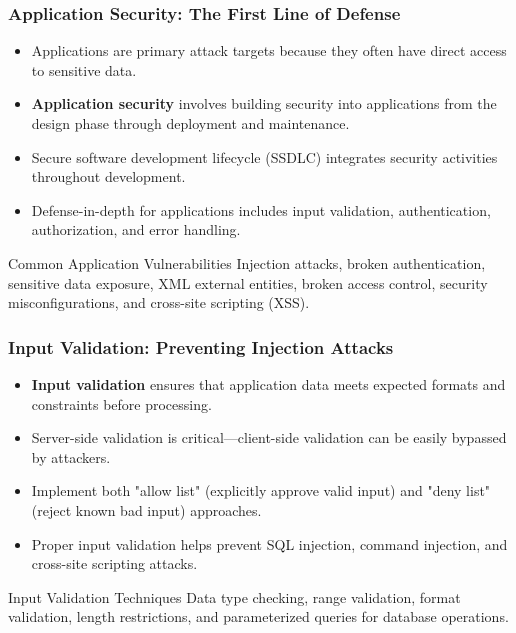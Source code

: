 \documentclass{beamer}
\begin{document}
\begin{frame}
    \frametitle{Application Security: The First Line of Defense}
    
    \begin{itemize}
        \item Applications are primary attack targets because they often have direct access to sensitive data.
        \item \textbf{Application security} involves building security into applications from the design phase through deployment and maintenance.
        \item Secure software development lifecycle (SSDLC) integrates security activities throughout development.
        \item Defense-in-depth for applications includes input validation, authentication, authorization, and error handling.
    \end{itemize}
    
    \begin{alertblock}{Common Application Vulnerabilities}
        Injection attacks, broken authentication, sensitive data exposure, XML external entities, broken access control, security misconfigurations, and cross-site scripting (XSS).
    \end{alertblock}
\end{frame}

\begin{frame}
    \frametitle{Input Validation: Preventing Injection Attacks}
    
    \begin{itemize}
        \item \textbf{Input validation} ensures that application data meets expected formats and constraints before processing.
        \item Server-side validation is critical—client-side validation can be easily bypassed by attackers.
        \item Implement both "allow list" (explicitly approve valid input) and "deny list" (reject known bad input) approaches.
        \item Proper input validation helps prevent SQL injection, command injection, and cross-site scripting attacks.
    \end{itemize}
    
    \begin{exampleblock}{Input Validation Techniques}
        Data type checking, range validation, format validation, length restrictions, and parameterized queries for database operations.
    \end{exampleblock}
\end{frame}
\end{document}
